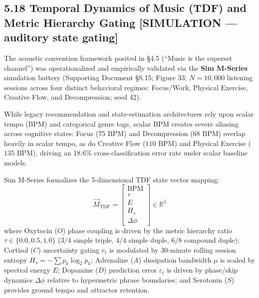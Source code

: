 \documentclass[
]{article}
\begin{document}
\subsection{5.18 Temporal Dynamics of Music (TDF) and Metric Hierarchy
Gating {[}SIMULATION --- auditory state
gating{]}}\label{temporal-dynamics-of-music-tdf-and-metric-hierarchy-gating-simulation-auditory-state-gating}

The acoustic convention framework posited in §4.5 (``Music is the
superset channel'') was operationalized and empirically validated via
the \textbf{Sim M-Series} simulation battery (Supporting Document §S.15;
Figure 33; \(N = 10,000\) listening sessions across four distinct
behavioral regimes: Focus/Work, Physical Exercise, Creative Flow, and
Decompression; seed 42).

While legacy recommendation and state-estimation architectures rely upon
scalar tempo (BPM) and categorical genre tags, scalar BPM creates severe
aliasing across cognitive states: Focus (\(75\text{ BPM}\)) and
Decompression (\(68\text{ BPM}\)) overlap heavily in scalar tempo, as do
Creative Flow (\(110\text{ BPM}\)) and Physical Exercise
(\(135\text{ BPM}\)), driving an 18.6\% cross-classification error rate
under scalar baseline models.

Sim M-Series formalizes the 5-dimensional TDF state vector mapping: \[
\vec{M}_{\text{TDF}} = \begin{bmatrix} \text{BPM} \\ \tau \\ E \\ H_s \\ \Delta \phi \end{bmatrix} \in \mathbb{R}^5
\] where Oxytocin (\(O\)) phase coupling is driven by the metric
hierarchy ratio \(\tau \in \{0.0, 0.5, 1.0\}\) (\(3/4\) simple triple,
\(4/4\) simple duple, \(6/8\) compound duple); Cortisol (\(C\))
uncertainty gating \(r_t\) is modulated by 30-minute rolling session
entropy \(H_s = -\sum p_k \log_2 p_k\); Adrenaline (\(A\)) dissipation
bandwidth \(\mu\) is scaled by spectral energy \(E\); Dopamine (\(D\))
prediction error \(\varepsilon_t\) is driven by phase/skip dynamics
\(\Delta \phi\) relative to hypermetric phrase boundaries; and Serotonin
(\(S\)) provides ground tempo and attractor retention.
\end{document}
